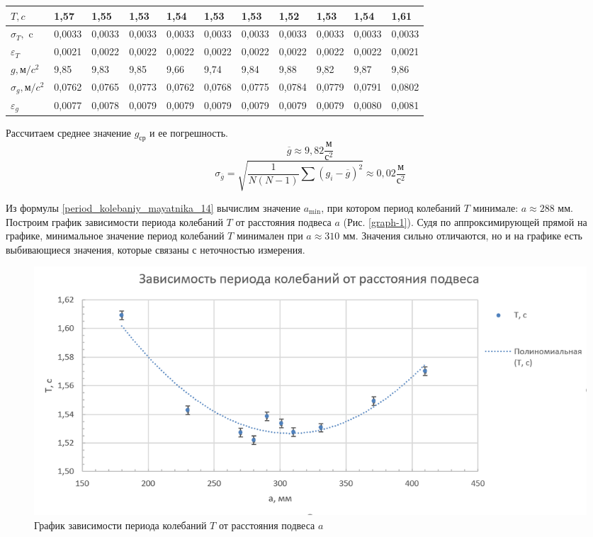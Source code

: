 \documentclass[a4paper,12pt]{article}
\begin{document}
\begin{table}[h]
\begin{tabular}{|l|l|l|l|l|l|l|l|l|l|l|}
$T, c$                      & 1,57   & 1,55   & 1,53   & 1,54   & 1,53   & 1,53   & 1,52   & 1,53   & 1,54   & 1,61   \\ \hline
$\sigma_T,$ c                        & 0,0033 & 0,0033 & 0,0033 & 0,0033 & 0,0033 & 0,0033 & 0,0033 & 0,0033 & 0,0033 & 0,0033 \\ \hline
$\varepsilon_T$                       & 0,0021 & 0,0022 & 0,0022 & 0,0022 & 0,0022 & 0,0022 & 0,0022 & 0,0022 & 0,0022 & 0,0021 \\ \hline
$g, \text{м}/c^2$ & 9,85   & 9,83   & 9,85   & 9,66   & 9,74   & 9,84   & 9,88   & 9,82   & 9,87   & 9,86   \\ \hline
$\sigma_g, \text{м}/c^2$                       & 0,0762 & 0,0765 & 0,0773 & 0,0762 & 0,0768 & 0,0775 & 0,0784 & 0,0779 & 0,0791 & 0,0802 \\ \hline
$\varepsilon_g$                       & 0,0077 & 0,0078 & 0,0079 & 0,0079 & 0,0079 & 0,0079 & 0,0079 & 0,0079 & 0,0080 & 0,0081 \\ \hline
\end{tabular}
\end{table}


Рассчитаем среднее значение $g_{\text{ср}}$ и ее погрешность.
\[ \overline{g} \approx 9,82 \dfrac{\text{м}}{\text{с}^2} \]
\[ \sigma_{\overline{g}} = \sqrt{\frac{1}{N  (N-1)}\sum(g_i-\overline{g})^2} \approx 0,02  \dfrac{\text{м}}{\text{с}^2} \]


Из формулы \ref{period_kolebaniy_mayatnika_14} вычислим значение $a_\text{min}$, при котором период колебаний $T$ минимале: $a \approx 288$ мм. Построим график зависимости периода колебаний $T$ от расстояния подвеса $a$ (Рис. \eqref{graph-1}). Судя по аппроксимирующей прямой на графике, минимальное значение период колебаний $T$ минимален при $a \approx 310$ мм. Значения сильно отличаются, но и на графике есть выбивающиеся значения, которые связаны с неточностью измерения. 


\newpage

\begin{figure}
\includegraphics[width=1\textwidth]{graph-1.png}
\caption{График зависимости периода колебаний $T$ от расстояния подвеса $a$}
\label{graph-1}
\end{figure}
\end{document}
